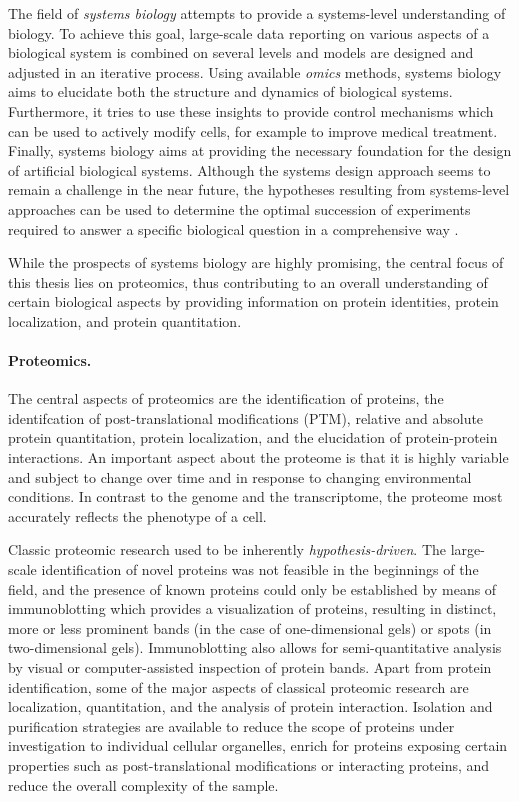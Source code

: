 The field of {\em systems biology} attempts to provide a systems-level 
understanding of biology. 
To achieve this goal, large-scale data reporting on various aspects of a 
biological system is combined on several levels and models are designed and
adjusted in an iterative process.
Using available {\em omics} methods, systems biology aims to elucidate both 
the structure and dynamics of biological systems.
Furthermore, it tries to use these insights to provide control mechanisms which
can be used to actively modify cells, for example to improve medical treatment.
Finally, systems biology aims at providing the necessary foundation for
the design of artificial biological systems.
Although the systems design approach seems to remain a challenge in the near
future, the hypotheses resulting from systems-level approaches can be used
to determine the optimal succession of experiments required to answer a
specific biological question in a comprehensive way \citep{Ideker2000}.

While the prospects of systems biology are highly promising, the central focus
of this thesis lies on proteomics, thus contributing to an overall understanding
of certain biological aspects by providing information on protein identities,
protein localization, and protein quantitation.

\paragraph{Proteomics.}

The central aspects of proteomics are the identification of proteins, 
the identifcation of post-translational modifications (PTM), 
relative and absolute protein quantitation, protein localization, and
the elucidation of protein-protein interactions.
An important aspect about the proteome is that it is highly variable and
subject to change over time and in response to changing environmental 
conditions.
In contrast to the genome and the transcriptome, the proteome most accurately
reflects the phenotype of a cell.

Classic proteomic research used to be inherently {\em hypothesis-driven}.
The large-scale identification of novel proteins was not feasible
in the beginnings of the field, and the presence of known proteins could only
be established by means of immunoblotting which provides a visualization
of proteins, resulting in distinct, more or less prominent bands (in the case 
of one-dimensional gels) or spots (in two-dimensional gels).
Immunoblotting also allows for semi-quantitative analysis by visual or 
computer-assisted inspection of protein bands.
Apart from protein identification, some of the major aspects of classical 
proteomic research are localization, quantitation, and the analysis of protein 
interaction.
Isolation and purification strategies are available to reduce the scope of
proteins under investigation to individual cellular organelles, enrich for
proteins exposing certain properties such as post-translational modifications
or interacting proteins, and reduce the overall complexity of the sample.


